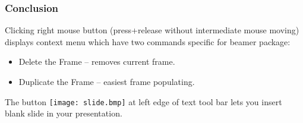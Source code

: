 \documentclass{beamer}
\begin{document}
\begin{frame}
  \frametitle{Conclusion}

  Clicking right mouse button 
  (press+release without intermediate mouse moving) 
  displays context menu
  which have two commands specific for beamer package: 

  \begin{itemize}
  \item
     \alert{Delete the Frame} -- removes current frame.
  \item
     \alert{Duplicate the Frame} -- easiest frame populating.
  \end{itemize}

  The button \texttt{[image: slide.bmp]} 
  at left edge of text 
  tool bar lets you insert blank slide in your presentation.

\end{frame}
\end{document}
